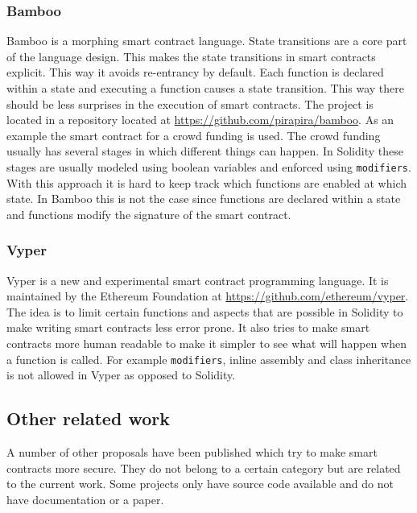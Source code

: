 \documentclass[a4paper]{article}
\begin{document}
\subsubsection{Bamboo}
Bamboo is a morphing smart contract language. State transitions are a core part of the language design. This makes the state transitions in smart contracts explicit. This way it avoids re-entrancy by default. Each function is declared within a state and executing a function causes a state transition. This way there should be less surprises in the execution of smart contracts. The project is located in a repository located at \url{https://github.com/pirapira/bamboo}. As an example the smart contract for a crowd funding is used. The crowd funding usually has several stages in which different things can happen. In Solidity these stages are usually modeled using boolean variables and enforced using \texttt{modifiers}. With this approach it is hard to keep track which functions are enabled at which state. In Bamboo this is not the case since functions are declared within a state and functions modify the signature of the smart contract. 
\subsubsection{Vyper}
Vyper is a new and experimental smart contract programming language. It is maintained by the Ethereum Foundation at \url{https://github.com/ethereum/vyper}. The idea is to limit certain functions and aspects that are possible in Solidity to make writing smart contracts less error prone. It also tries to make smart contracts more human readable to make it simpler to see what will happen when a function is called. For example \texttt{modifiers}, inline assembly and class inheritance is not allowed in Vyper as opposed to Solidity. 

\subsection{Other related work}
A number of other proposals have been published which try to make smart contracts more secure. They do not belong to a certain category but are related to the current work. Some projects only have source code available and do not have documentation or a paper.
\end{document}
